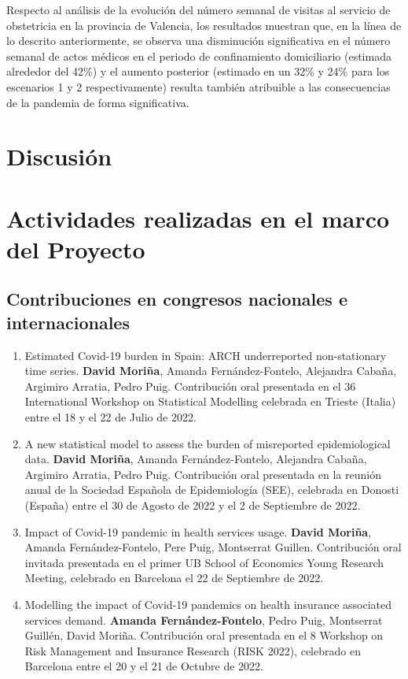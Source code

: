 \documentclass[12pt,twoside]{article} %
\begin{document}
Respecto al análisis de la evolución del número semanal de visitas al servicio de obstetricia en la provincia de Valencia, los resultados muestran que, en la línea de lo descrito anteriormente, se observa una disminución significativa en el número semanal de actos médicos en el periodo de confinamiento domiciliario (estimada alrededor del 42\%) y el aumento posterior (estimado en un 32\% y 24\% para los escenarios 1 y 2 respectivamente) resulta también atribuible a las consecuencias de la pandemia de forma significativa.  

\section{Discusión}


\section{Actividades realizadas en el marco del Proyecto}
\subsection{Contribuciones en congresos nacionales e internacionales}
\begin{enumerate}
  \item Estimated Covid-19 burden in Spain: ARCH underreported non-stationary time series. \textbf{David Moriña}, Amanda Fernández-Fontelo, Alejandra Cabaña, Argimiro Arratia, Pedro Puig. Contribución oral presentada en el 36 International Workshop on Statistical Modelling celebrada en Trieste (Italia) entre el 18 y el 22 de Julio de 2022.
  \item A new statistical model to assess the burden of misreported epidemiological data. \textbf{David Moriña}, Amanda Fernández-Fontelo, Alejandra Cabaña, Argimiro Arratia, Pedro Puig. Contribución oral presentada en la reunión anual de la Sociedad Española de Epidemiología (SEE), celebrada en Donosti (España) entre el 30 de Agosto de 2022 y el 2 de Septiembre de 2022.
  \item Impact of Covid-19 pandemic in health services usage. \textbf{David Moriña}, Amanda Fernández-Fontelo, Pere Puig, Montserrat Guillen. Contribución oral invitada presentada en el primer UB School of Economics Young Research Meeting, celebrado en Barcelona el 22 de Septiembre de 2022. 
  \item Modelling the impact of Covid-19 pandemics on health insurance associated services demand. \textbf{Amanda Fernández-Fontelo}, Pedro Puig, Montserrat Guillén, David Moriña. Contribución oral presentada en el 8 Workshop on Risk Management and Insurance Research (RISK 2022), celebrado en Barcelona entre el 20 y el 21 de Octubre de 2022.
\end{enumerate}
  
\end{document}
